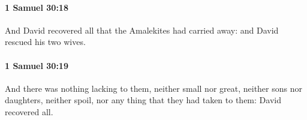 		\paragraph{1 Samuel 30:18} %
			\label{1SAMUEL-30-18}

			And David recovered all that the Amalekites had carried away: and David rescued his two wives.


		\paragraph{1 Samuel 30:19} %
			\label{1SAMUEL-30-19}

			And there was nothing lacking to them, neither small nor great, neither sons nor daughters, neither spoil, nor any thing that they had taken to them: David recovered all.


